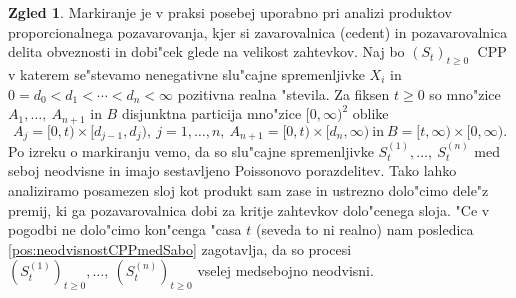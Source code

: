 \documentclass[12pt, a4paper, reqno]{amsart}
\theoremstyle{definition}
\newtheorem{zgled}[definicija]{Zgled}
\theoremstyle{plain}
\newcommand{\1}{\mathds{1}}
\DeclareMathOperator{\CPP}{CPP}
\begin{document}
        \begin{zgled}
            Markiranje je v praksi posebej uporabno pri analizi produktov 
            proporcionalnega pozavarovanja, kjer si zavarovalnica (cedent) in  
            pozavarovalnica delita obveznosti in dobi"cek glede na velikost zahtevkov. Naj bo $(S_t)_{t\geq0}$ $\CPP$  
            v katerem se"stevamo nenegativne slu"cajne spremenljivke $X_i$ in $ 0 = d_0 < d_1 < \cdots < d_n < \infty$ pozitivna realna "stevila. 
            Za fiksen $t\geq0$ so mno"zice 
            $A_1, \dots, \ A_{n + 1}$ in $B$ disjunktna particija mno"zice $[0, \infty)^2$ oblike 
            \begin{equation*}
                A_j = [0, t)\times [d_{j-1}, d_j), \ j = 1, \dots, n, \ A_{n+1} = [0, t)\times [d_n, \infty) \ \text{in} \ B = [t, \infty)\times [0, \infty).
            \end{equation*}
            Po izreku o markiranju vemo, da so slu"cajne spremenljivke $S_t^{(1)}, \dots, \ S_t^{(n)}$ 
            med seboj neodvisne in imajo sestavljeno Poissonovo porazdelitev. Tako lahko analiziramo 
            posamezen sloj kot produkt sam zase in ustrezno dolo"cimo dele"z premij, ki ga pozavarovalnica dobi 
            za kritje zahtevkov dolo"cenega sloja. "Ce v pogodbi ne dolo"cimo kon"cenga "casa $t$ (seveda
            to ni realno) nam posledica \ref{pos:neodvisnostCPPmedSabo} zagotavlja, da so procesi 
            $(S_t^{(1)})_{t\geq0}, \dots, \ (S_t^{(n)})_{t\geq0}$ vselej medsebojno neodvisni.
        \end{zgled}
\end{document}
